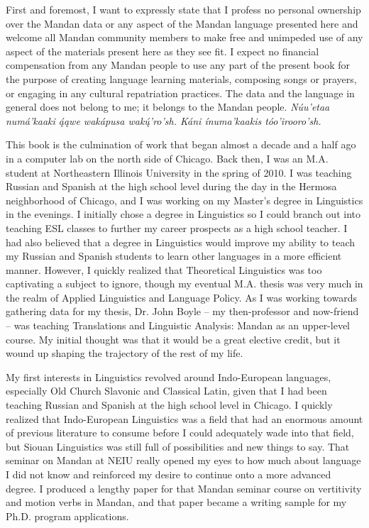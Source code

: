 \addchap{\lsPrefaceTitle}

First and foremost, I want to expressly state that I profess no personal ownership over the Mandan data or any aspect of the Mandan language presented here and welcome all Mandan community members to make free and unimpeded use of any aspect of the materials present here as they see fit. I expect no financial compensation from any Mandan people to use any part of the present book for the purpose of creating language learning materials, composing songs or prayers, or engaging in any cultural repatriation practices. The data and the language in general does not belong to me; it belongs to the Mandan people. \textit{Núu'etaa numá'kaaki ą́ąwe wakápusa wakų́'ro'sh. Káni ínuma'kaakis tóo'irooro'sh.}
 
This book is the culmination of work that began almost a decade and a half ago in a computer lab on the north side of Chicago. Back then, I was an M.A. student at Northeastern Illinois University in the spring of 2010. I was teaching Russian and Spanish at the high school level during the day in the Hermosa neighborhood of Chicago, and I was working on my Master's degree in Linguistics in the evenings. I initially chose a degree in Linguistics so I could branch out into teaching ESL classes to further my career prospects as a high school teacher. I had also believed that a degree in Linguistics would improve my ability to teach my Russian and Spanish students to learn other languages in a more efficient manner. However, I quickly realized that Theoretical Linguistics was too captivating a subject to ignore, though my eventual M.A. thesis was very much in the realm of Applied Linguistics and Language Policy.  As I was working towards gathering data for my thesis, Dr. John Boyle -- my then-professor and now-friend -- was teaching Translations and Linguistic Analysis: Mandan as an upper-level course. My initial thought was that it would be a great elective credit, but it wound up shaping the trajectory of the rest of my life.

My first interests in Linguistics revolved around Indo-European languages, especially Old Church Slavonic and Classical Latin, given that I had been teaching Russian and Spanish at the high school level in Chicago. I quickly realized that Indo-European Linguistics was a field that had an enormous amount of previous literature to consume before I could adequately wade into that field, but Siouan Linguistics was still full of possibilities and new things to say. That seminar on Mandan at NEIU really opened my eyes to how much about language I did not know and reinforced my desire to continue onto a more advanced degree. I produced a lengthy paper for that Mandan seminar course on vertitivity and motion verbs in Mandan, and that paper became a writing sample for my Ph.D. program applications.

